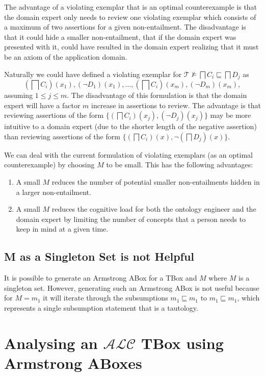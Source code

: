 \documentclass{amsart}
\begin{document}
  The advantage of a violating exemplar that is an optimal counterexample is that the domain expert only needs to review one violating exemplar which consists of a maximum of two assertions for a given non-entailment. The disadvantage is that it could hide a smaller non-entailment, that if the domain expert was presented with it, could have resulted in the domain expert realizing that it must be an axiom of the application domain.
  
  Naturally we could have defined a violating exemplar for $\mathcal{T} \nvDash \bigsqcap C_i \sqsubseteq \bigsqcap D_j$ as 
  \[(\bigsqcap C_i)(x_1), (\neg D_1)(x_1), \ldots,(\bigsqcap C_i)(x_m), (\neg D_m)(x_m),\]
  assuming $1 \leq j \leq m$. The disadvantage of this formulation is that the domain expert will have a factor $m$ increase in assertions to review. The advantage is that reviewing assertions of the form $\{(\bigsqcap C_i)(x_j), (\neg D_j)(x_j)\}$ may be more intuitive to a domain expert (due to the shorter length of the negative assertion) than reviewing assertions of the form $\{(\bigsqcap C_i)(x), \neg(\bigsqcap D_j)(x)\}$.
  
  We can deal with the current formulation of violating exemplars (as an optimal counterexample) by choosing $M$ to be small. This has the following advantages:
  \begin{enumerate}
   \item A small $M$ reduces the number of potential smaller non-entailments hidden in a larger non-entailment.
   \item A small $M$ reduces the cognitive load for both the ontology engineer and the domain expert by limiting the number of concepts that a person needs to keep in mind at a given time.
  \end{enumerate}

  \subsection{M as a Singleton Set is not Helpful} 
  It is possible to generate an Armstrong ABox for a TBox and $M$ where $M$ is a singleton set. However, generating such an Armstrong ABox is not useful because for $M = {m_1}$ it will iterate through the subsumptions $m_1 \sqsubseteq m_1$ to $m_1 \sqsubseteq m_1$, which represents a single subsumption statement that is a tautology.
   
 \section{Analysing an $\mathcal{ALC}$ TBox using Armstrong ABoxes}
\end{document}
